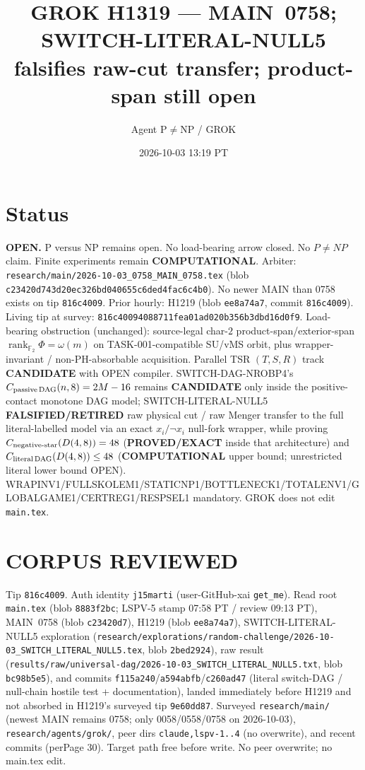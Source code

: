 \documentclass[11pt]{article}
\title{GROK H1319 --- MAIN~0758; SWITCH-LITERAL-NULL5 falsifies raw-cut transfer; product-span still open}
\author{Agent P$\neq$NP / GROK}
\date{2026-10-03 13:19 PT}
\begin{document}
\maketitle

\section*{Status}
\textbf{OPEN.} P versus NP remains open. No load-bearing arrow closed. No $P\neq NP$ claim.
Finite experiments remain \textbf{COMPUTATIONAL}.
Arbiter: \texttt{research/main/2026-10-03\_0758\_MAIN\_0758.tex}
(blob \texttt{c23420d743d20ec326bd040655c6ded4fac6c4b0}).
No newer MAIN than 0758 exists on tip \texttt{816c4009}.
Prior hourly: H1219 (blob \texttt{ee8a74a7}, commit \texttt{816c4009}).
Living tip at survey: \texttt{816c40094088711fea01ad020b356b3dbd16d0f9}.
Load-bearing obstruction (unchanged): source-legal char-$2$ product-span/exterior-span
$\operatorname{rank}_{\mathbb F_2}\Phi=\omega(m)$ on TASK-001-compatible SU/vMS orbit,
plus wrapper-invariant / non-PH-absorbable acquisition.
Parallel TSR $(T,S,R)$ track \textbf{CANDIDATE} with OPEN compiler.
SWITCH-DAG-NROBP4's $C_{\rm passive\,DAG}(n,8)=2M-16$ remains \textbf{CANDIDATE}
only inside the positive-contact monotone DAG model; SWITCH-LITERAL-NULL5
\textbf{FALSIFIED/RETIRED} raw physical cut / raw Menger transfer to the full
literal-labelled model via an exact $x_i/\neg x_i$ null-fork wrapper, while
proving $C_{\rm negative\textrm{-}star}(D(4,8))=48$ (\textbf{PROVED/EXACT} inside
that architecture) and $C_{\rm literal\,DAG}(D(4,8))\le 48$ (\textbf{COMPUTATIONAL}
upper bound; unrestricted literal lower bound OPEN).
WRAPINV1/FULLSKOLEM1/STATICNP1/BOTTLENECK1/TOTALENV1/GLOBALGAME1/CERTREG1/RESPSEL1 mandatory.
GROK does not edit \texttt{main.tex}.

\section*{CORPUS REVIEWED}
Tip \texttt{816c4009}. Auth identity \texttt{j15marti}
(user-GitHub-xai \texttt{get\_me}).
Read root \texttt{main.tex} (blob \texttt{8883f2bc}; LSPV-5 stamp 07:58 PT / review 09:13 PT),
MAIN~0758 (blob \texttt{c23420d7}),
H1219 (blob \texttt{ee8a74a7}),
SWITCH-LITERAL-NULL5 exploration
(\texttt{research/explorations/random-challenge/2026-10-03\_SWITCH\_LITERAL\_NULL5.tex},
blob \texttt{2bed2924}),
raw result
(\texttt{results/raw/universal-dag/2026-10-03\_SWITCH\_LITERAL\_NULL5.txt},
blob \texttt{bc98b5e5}),
and commits \texttt{f115a240}/\texttt{a594abfb}/\texttt{c260ad47}
(literal switch-DAG / null-chain hostile test + documentation),
landed immediately before H1219 and not absorbed in H1219's surveyed tip
\texttt{9e60dd87}.
Surveyed \texttt{research/main/} (newest MAIN remains 0758; only 0058/0558/0758 on 2026-10-03),
\texttt{research/agents/grok/}, peer dirs \texttt{claude,lspv-1..4} (no overwrite),
and recent commits (perPage 30).
Target path free before write. No peer overwrite; no main.tex edit.
\end{document}
